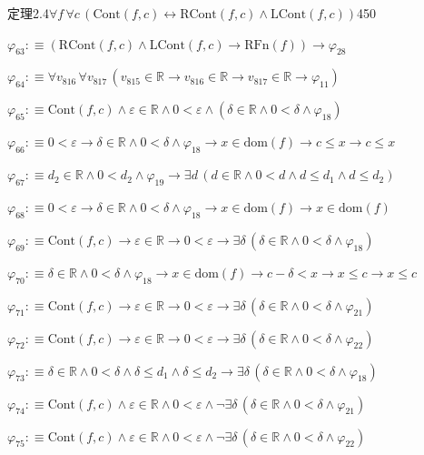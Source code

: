 \begin{fullproof}{定理2.4}{$\forall f\,\forall c\,(\mathrm{Cont}(f,c) \leftrightarrow \mathrm{RCont}(f,c) \land \mathrm{LCont}(f,c))$}{450}
\begin{abbrevlist}
\item $\varphi_{63} :\equiv (\mathrm{RCont}(f,c) \land \mathrm{LCont}(f,c) \to \mathrm{RFn}(f)) \to \varphi_{28}$
\item $\varphi_{64} :\equiv \forall v_{816}\,\forall v_{817}\,(v_{815} \in \mathbb{R} \to v_{816} \in \mathbb{R} \to v_{817} \in \mathbb{R} \to \varphi_{11})$
\item $\varphi_{65} :\equiv \mathrm{Cont}(f,c) \land \varepsilon \in \mathbb{R} \land 0 < \varepsilon \land (\delta \in \mathbb{R} \land 0 < \delta \land \varphi_{18})$
\item $\varphi_{66} :\equiv 0 < \varepsilon \to \delta \in \mathbb{R} \land 0 < \delta \land \varphi_{18} \to x \in \mathrm{dom}(f) \to c \leq x \to c \leq x$
\item $\varphi_{67} :\equiv d_{2} \in \mathbb{R} \land 0 < d_{2} \land \varphi_{19} \to \exists d\,(d \in \mathbb{R} \land 0 < d \land d \leq d_{1} \land d \leq d_{2})$
\item $\varphi_{68} :\equiv 0 < \varepsilon \to \delta \in \mathbb{R} \land 0 < \delta \land \varphi_{18} \to x \in \mathrm{dom}(f) \to x \in \mathrm{dom}(f)$
\item $\varphi_{69} :\equiv \mathrm{Cont}(f,c) \to \varepsilon \in \mathbb{R} \to 0 < \varepsilon \to \exists \delta\,(\delta \in \mathbb{R} \land 0 < \delta \land \varphi_{18})$
\item $\varphi_{70} :\equiv \delta \in \mathbb{R} \land 0 < \delta \land \varphi_{18} \to x \in \mathrm{dom}(f) \to c - \delta < x \to x \leq c \to x \leq c$
\item $\varphi_{71} :\equiv \mathrm{Cont}(f,c) \to \varepsilon \in \mathbb{R} \to 0 < \varepsilon \to \exists \delta\,(\delta \in \mathbb{R} \land 0 < \delta \land \varphi_{21})$
\item $\varphi_{72} :\equiv \mathrm{Cont}(f,c) \to \varepsilon \in \mathbb{R} \to 0 < \varepsilon \to \exists \delta\,(\delta \in \mathbb{R} \land 0 < \delta \land \varphi_{22})$
\item $\varphi_{73} :\equiv \delta \in \mathbb{R} \land 0 < \delta \land \delta \leq d_{1} \land \delta \leq d_{2} \to \exists \delta\,(\delta \in \mathbb{R} \land 0 < \delta \land \varphi_{18})$
\item $\varphi_{74} :\equiv \mathrm{Cont}(f,c) \land \varepsilon \in \mathbb{R} \land 0 < \varepsilon \land \neg \exists \delta\,(\delta \in \mathbb{R} \land 0 < \delta \land \varphi_{21})$
\item $\varphi_{75} :\equiv \mathrm{Cont}(f,c) \land \varepsilon \in \mathbb{R} \land 0 < \varepsilon \land \neg \exists \delta\,(\delta \in \mathbb{R} \land 0 < \delta \land \varphi_{22})$

\end{abbrevlist}
\end{fullproof}
